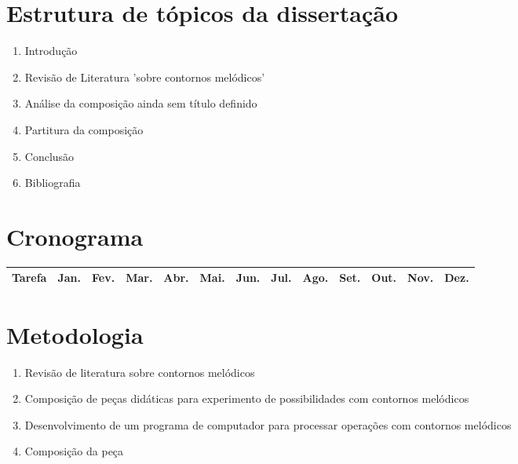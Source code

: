 \documentclass{article}
\begin{document}
\section{Estrutura de tópicos da dissertação}
\label{sec:estrutura-de-topicos}

\begin{enumerate}
\item Introdução
\item Revisão de Literatura 'sobre contornos melódicos'
\item Análise da composição ainda sem título definido
\item Partitura da composição
\item Conclusão
\item Bibliografia
\end{enumerate}

\section{Cronograma}
\label{sec:cronograma}

\begin{table}[h]
  \centering
  \begin{tabular}{lllllllllllll}
    \hline
    Tarefa & Jan. & Fev. & Mar. & Abr. & Mai. & Jun. & Jul. & Ago. & Set. &
    Out. & Nov. & Dez. \\
    \hline


    \hline
  \end{tabular}
  \label{tab:cronograma}
\end{table}


\section{Metodologia}
\label{sec:metodologia}

\begin{enumerate}
\item Revisão de literatura sobre contornos melódicos
\item Composição de peças didáticas para experimento de possibilidades
  com contornos melódicos
\item Desenvolvimento de um programa de computador para processar
  operações com contornos melódicos
\item Composição da peça
\end{enumerate}

\renewcommand{\refname}{Bibliografia}
\end{document}
